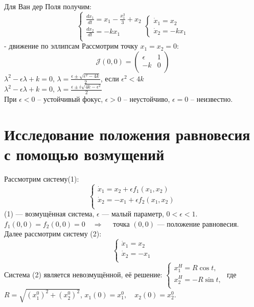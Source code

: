 Для Ван дер Поля получим: 
\[
\begin{cases}
	\frac{dx_1}{dt}= x_1 - \frac{x_1^3}{3}+x_2 \\
	\frac{dx_2}{dt}=-kx_1 \\
\end{cases}
\begin{cases}
	\dot{x}_1 = x_2 \\
	\dot{x}_2 = -kx_1 
\end{cases}
\]
- движение по эллипсам
Рассмотрим точку $x_1=x_2=0$:
\[
	\mathcal{J}(0,0) = \left(
\begin{matrix}
	\epsilon & 1 \\
	-k & 0	\\
\end{matrix} 
\right)
\] 	
$\lambda^2-\epsilon \lambda + k = 0, \, \lambda = \frac{\epsilon \pm \sqrt{\epsilon^2-4k}}{2}$, если $\epsilon^2 < 4k$ \\
$\lambda^2-\epsilon \lambda + k = 0, \, \lambda = \frac{\epsilon \pm i\sqrt{4k-\epsilon^2}}{2}$ \\
При $\epsilon < 0$ -- устойчивый фокус, $\epsilon > 0$ -- неустойчиво, $\epsilon = 0$ -- неизвестно.
 
 
 
 	\section{Исследование положения равновесия с помощью возмущений}
 	Рассмотрим систему(1):
 	\[
 	\begin{cases}
 	\dot x_1 = x_2 + \epsilon f_1(x_1, x_2)\\
 	\dot x_2 = -x_1 + \epsilon f_2(x_1, x_2)\\
 	\end{cases}
 	\]
 	(1) --- возмущённая система, \(\epsilon\) --- малый параметр, \(0 <\epsilon <1\).\\
 	
 	\(f_1(0,0)=f_2(0,0)=0 \quad \Rightarrow \quad\)  точка \((0,0)\) --- положение равновесия.\\
 	
 	Далее рассмотрим систему (2):
 	\[
 	\begin{cases}
 	\dot x_1 = x_2 \\
 	\dot x_2 = -x_1\\
 	\end{cases}
 	\]
 	Система (2) является невозмущённой, её решение:
 	\(
 	\begin{cases}
 	x_1^H = R \cos t, \\
 	x_2^H = -R \sin t,\\
 	\end{cases}
 	\) где \(R = \sqrt{(x_1^0)^2 + (x_2^0)^2}\),  \(x_1(0) = x_1^0, \quad x_2(0) = x_2^0\).\\
 	
